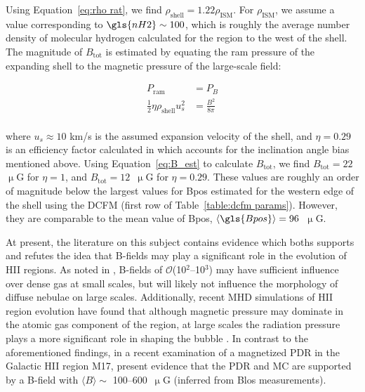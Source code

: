 Using Equation~\ref{eq:rho rat}, we find $\rho_{\mathrm{shell}} = 1.22 \rho_{\mathrm{ISM}}$. For $\rho_{\mathrm{ISM}}$, we assume a value corresponding to $\gls{nH2} \sim 100$, which is roughly the average number density of molecular hydrogen calculated for the region to the west of the shell. The magnitude of $B_{\mathrm{\mathrm{tot}}}$ is estimated by equating the ram pressure of the expanding shell to the magnetic pressure of the large-scale field:

\begin{equation}\label{eq:B_est}
  \begin{aligned}
    P_{\mathrm{ram}} &= P_{B} \\
     \frac{1}{2} \eta \rho_{\mathrm{shell}} u_{s}^{2} &= \frac{B^{2}}{8\pi} \\
  \end{aligned}
\end{equation}

where $u_{s} \approx 10$ km/s is the assumed expansion velocity of the shell, and $\eta = 0.29$ is an efficiency factor calculated in \citet{pavel2012h} which accounts for the inclination angle bias mentioned above. Using Equation~\ref{eq:B_est} to calculate $B_{\mathrm{\mathrm{tot}}}$, we find $B_{\mathrm{\mathrm{tot}}} = 22$~$\upmu$G for $\eta = 1$, and $B_{\mathrm{\mathrm{tot}}} = 12$~$\upmu$G for $\eta = 0.29$. These values are roughly an order of magnitude below the largest values for \gls{Bpos} estimated for the western edge of the shell using the DCFM (first row of Table~\ref{table:dcfm params}). However, they are comparable to the mean value of \gls{Bpos}, $\langle \gls{Bpos} \rangle = 96$~$\upmu$G.

At present, the literature on this subject contains evidence which boths supports and refutes the idea that B-fields may play a significant role in the evolution of HII regions. As noted in \citet{tremblin2014age}, B-fields of $\mathcal{O}$(10$^2$--10$^{3}$) may have sufficient influence over dense gas at small scales, but will likely not influence the morphology of diffuse nebulae on large scales. Additionally, recent MHD simulations of HII region evolution have found that although magnetic pressure may dominate in the atomic gas component of the region, at large scales the radiation pressure plays a more significant role in shaping the bubble \citep{rahner2017winds}. In contrast to the aforementioned findings, in a recent examination of a magnetized PDR in the Galactic HII region M17, \citet{pellegrini2007magnetically} present evidence that the PDR and MC are supported by a B-field with $\langle B \rangle \sim$ 100--600~$\upmu$G (inferred from \gls{Blos} measurements).


